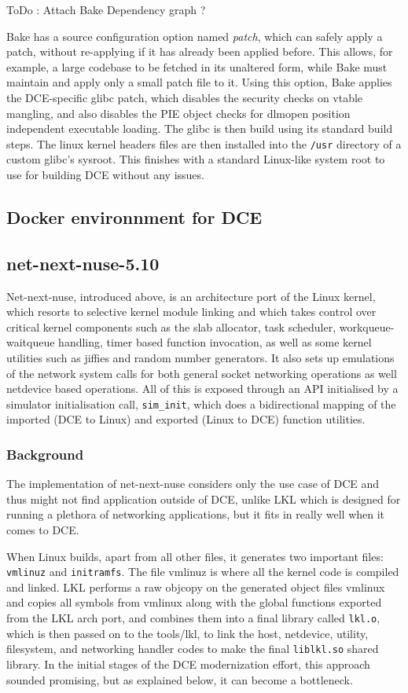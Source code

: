 \documentclass{sig-alternate}
\begin{document}
ToDo : Attach Bake Dependency graph ? 

Bake has a source configuration option named \textit{patch}, which can safely apply a patch, without re-applying if it has already been applied before.  This allows, for example, a large codebase to be fetched in its unaltered form, while Bake must maintain and apply only a small patch file to it.
Using this option, Bake applies the DCE-specific glibc patch, which disables the security checks on vtable mangling, and also disables the 
PIE object checks for dlmopen position independent executable loading. The glibc is then build using its standard build steps. The linux kernel headers
files are then installed into the \texttt{/usr} directory of a custom glibc's sysroot. This finishes with a standard Linux-like system root to use for building 
DCE without any issues. 


\subsection{Docker environnment for DCE}

\subsection{net-next-nuse-5.10}
Net-next-nuse, introduced above, is an architecture port of the Linux kernel, which resorts to selective kernel module linking and which takes control over critical kernel 
components such as the slab allocator, task scheduler, workqueue-waitqueue handling, timer based function invocation, as well as some kernel 
utilities such as jiffies and random number generators. It also sets up emulations of the network system calls for both general socket networking 
operations as well netdevice based operations. All of this is exposed through an API initialised by a simulator initialisation call, \texttt{sim\_init}, 
which does a bidirectional mapping of the imported (DCE to Linux) and exported (Linux to DCE) function utilities.

\subsubsection{Background}
The implementation of net-next-nuse considers only the use case of DCE and thus might not find application outside of DCE, unlike LKL which
is designed for running a plethora of networking applications, but it fits in really well when it comes to DCE. 

When Linux builds, apart from all other files, it generates two important files: \texttt{vmlinuz} and \texttt{initramfs}. The file vmlinuz is where all the kernel 
code is compiled and linked. LKL performs a raw objcopy on the generated object 
files vmlinux and copies all symbols from vmlinux along with the global functions exported from the LKL arch port, and combines them into a final 
library called \texttt{lkl.o}, which is then passed on to the tools/lkl, to link the host, netdevice, utility, filesystem, and networking handler codes to 
make the final \texttt{liblkl.so} shared library. In the initial stages of the DCE modernization effort, this approach sounded promising, but as explained below, it can become a bottleneck.
\end{document}
